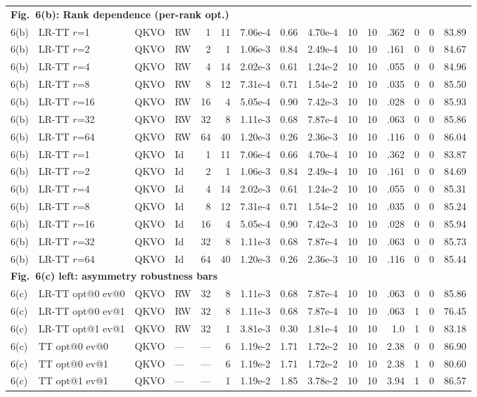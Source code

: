 \documentclass[fleqn,10pt]{wlscirep}
\begin{document}
{\begin{longtable}{@{}l l l l r r r r r r r r r r r@{}}
\multicolumn{15}{l}{\cellcolor{HeadGray}\textbf{Fig.~6(b): Rank dependence (per-rank opt.)}} \\
6(b) & LR-TT $r$=1 & QKVO & RW & 1 & 11 & 7.06e-4 & 0.66 & 4.70e-4 & 10 & 10 & .362 & 0 & 0 & 83.89 \\
6(b) & LR-TT $r$=2 & QKVO & RW & 2 & 1 & 1.06e-3 & 0.84 & 2.49e-4 & 10 & 10 & .161 & 0 & 0 & 84.67 \\
6(b) & LR-TT $r$=4 & QKVO & RW & 4 & 14 & 2.02e-3 & 0.61 & 1.24e-2 & 10 & 10 & .055 & 0 & 0 & 84.96 \\
6(b) & LR-TT $r$=8 & QKVO & RW & 8 & 12 & 7.31e-4 & 0.71 & 1.54e-2 & 10 & 10 & .035 & 0 & 0 & 85.50 \\
6(b) & LR-TT $r$=16 & QKVO & RW & 16 & 4 & 5.05e-4 & 0.90 & 7.42e-3 & 10 & 10 & .028 & 0 & 0 & 85.93 \\
6(b) & LR-TT $r$=32 & QKVO & RW & 32 & 8 & 1.11e-3 & 0.68 & 7.87e-4 & 10 & 10 & .063 & 0 & 0 & 85.86 \\
6(b) & LR-TT $r$=64 & QKVO & RW & 64 & 40 & 1.20e-3 & 0.26 & 2.36e-3 & 10 & 10 & .116 & 0 & 0 & 86.04 \\
6(b) & LR-TT $r$=1 & QKVO & Id & 1 & 11 & 7.06e-4 & 0.66 & 4.70e-4 & 10 & 10 & .362 & 0 & 0 & 83.87 \\
6(b) & LR-TT $r$=2 & QKVO & Id & 2 & 1 & 1.06e-3 & 0.84 & 2.49e-4 & 10 & 10 & .161 & 0 & 0 & 84.69 \\
6(b) & LR-TT $r$=4 & QKVO & Id & 4 & 14 & 2.02e-3 & 0.61 & 1.24e-2 & 10 & 10 & .055 & 0 & 0 & 85.31 \\
6(b) & LR-TT $r$=8 & QKVO & Id & 8 & 12 & 7.31e-4 & 0.71 & 1.54e-2 & 10 & 10 & .035 & 0 & 0 & 85.24 \\
6(b) & LR-TT $r$=16 & QKVO & Id & 16 & 4 & 5.05e-4 & 0.90 & 7.42e-3 & 10 & 10 & .028 & 0 & 0 & 85.94 \\
6(b) & LR-TT $r$=32 & QKVO & Id & 32 & 8 & 1.11e-3 & 0.68 & 7.87e-4 & 10 & 10 & .063 & 0 & 0 & 85.73 \\
6(b) & LR-TT $r$=64 & QKVO & Id & 64 & 40 & 1.20e-3 & 0.26 & 2.36e-3 & 10 & 10 & .116 & 0 & 0 & 85.44 \\
\midrule

\multicolumn{15}{l}{\cellcolor{HeadGray}\textbf{Fig.~6(c) left: asymmetry robustness bars}} \\
6(c) & LR-TT opt@0 ev@0 & QKVO & RW & 32 & 8 & 1.11e-3 & 0.68 & 7.87e-4 & 10 & 10 & .063 & 0 & 0 & 85.86 \\
6(c) & LR-TT opt@0 ev@1 & QKVO & RW & 32 & 8 & 1.11e-3 & 0.68 & 7.87e-4 & 10 & 10 & .063 & 1 & 0 & 76.45 \\
6(c) & LR-TT opt@1 ev@1 & QKVO & RW & 32 & 1 & 3.81e-3 & 0.30 & 1.81e-4 & 10 & 10 & 1.0 & 1 & 0 & 83.18 \\
6(c) & TT opt@0 ev@0 & QKVO & --- & --- & 6 & 1.19e-2 & 1.71 & 1.72e-2 & 10 & 10 & 2.38 & 0 & 0 & 86.90 \\
6(c) & TT opt@0 ev@1 & QKVO & --- & --- & 6 & 1.19e-2 & 1.71 & 1.72e-2 & 10 & 10 & 2.38 & 1 & 0 & 80.60 \\
6(c) & TT opt@1 ev@1 & QKVO & --- & --- & 1 & 1.19e-2 & 1.85 & 3.78e-2 & 10 & 10 & 3.94 & 1 & 0 & 86.57 \\
\midrule


\end{longtable}}
\end{document}
